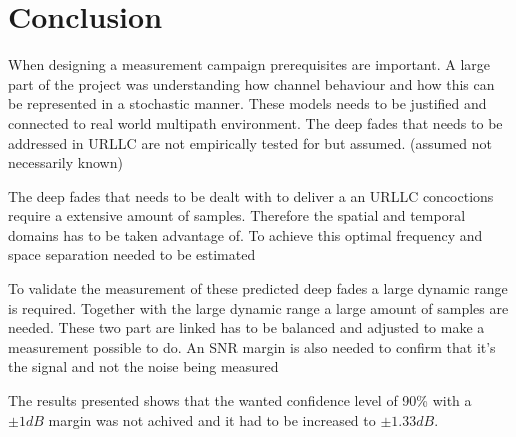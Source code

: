 \chapter{Conclusion}

When designing a measurement campaign prerequisites are important. A large part of the project was understanding how channel behaviour and how this can be represented in a stochastic manner. These models needs to be justified and connected to real world multipath environment. The deep fades that needs to be addressed in URLLC are not empirically tested for but assumed. (assumed not necessarily known)

The deep fades that needs to be dealt with to deliver a an URLLC concoctions require a extensive amount of samples. Therefore the spatial and temporal domains has to be taken advantage of. To achieve this optimal frequency and space separation needed to be estimated


To validate the measurement of these predicted deep fades a large dynamic range is required. Together with the large dynamic range a large amount of samples are needed. These two part are linked has to be balanced and adjusted to make a measurement possible to do. An SNR margin is also needed to confirm that it's the signal and not the noise being measured

The results presented shows that the wanted confidence level of 90\% with a $\pm 1dB$ margin was not achived and it had to be increased to $\pm 1.33dB$.





